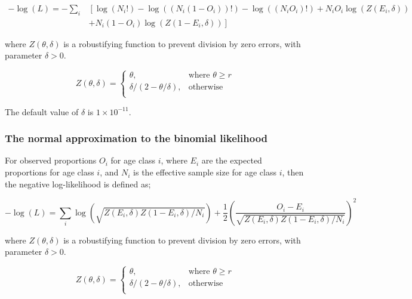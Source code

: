 \begin{equation}
\begin{split}
-\log \left(L \right)= -\sum\limits_i & \left[ \right. \log \left(N_i! \right) - \log \left(\left(N_i \left(1 - O_i \right) \right)! \right) - \log \left(\left(N_i O_i \right)! \right) + N_i O_i \log \left(Z\left(E_i,\delta \right) \right) \\
&+ N_i \left(1 - O_i \right)\log \left(Z\left(1 - E_i,\delta\right) \right) \left. \right]
\end{split}
\end{equation}

where $Z \left(\theta,\delta \right)$ is a robustifying function to prevent division by zero errors, with parameter $\delta>0$.

\begin{equation}
Z \left(\theta,\delta \right) = \begin{cases}
\theta, & \text{where $\theta \ge r$} \\
\delta/\left( 2-\theta/\delta \right), & \text{otherwise} \\
\end{cases}
\end{equation}

The default value of $\delta$ is $1 \times 10^{-11}$.

\subsubsection*{The normal approximation to the binomial likelihood}

For observed proportions $O_i$ for age class $i$, where $E_i$ are the expected proportions for age class $i$, and $N_i$ is the effective sample size for age class $i$, then the negative log-likelihood is defined as;

\begin{equation}
-\log \left(L \right)= \sum\limits_i \log \left( \sqrt{Z\left(E_i,\delta \right)Z\left(1-E_i,\delta\right)/N_i} \right) + \frac{1}{2} \left( \frac{O_i-E_i}{\sqrt{Z\left(E_i,\delta\right)Z\left(1-E_i,\delta \right)/N_i}} \right)^2
\end{equation}

where $Z \left(\theta,\delta \right)$ is a robustifying function to prevent division by zero errors, with parameter $\delta>0$.

\begin{equation}
Z \left(\theta,\delta \right) = \begin{cases}
\theta, & \text{where $\theta \ge r$} \\
\delta/\left( 2-\theta/\delta \right), & \text{otherwise} \\
\end{cases}
\end{equation}

